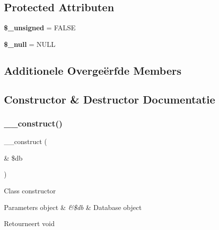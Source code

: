\subsection*{Protected Attributen}
\begin{DoxyCompactItemize}
\item 
\mbox{\label{class_c_i___d_b__sqlite3__forge_aae977ae6d61fa183f0b25422b6ddc31c}} 
{\bfseries \$\+\_\+unsigned} = F\+A\+L\+SE
\item 
\mbox{\label{class_c_i___d_b__sqlite3__forge_ae58fe6a5104d4a069a49b27533ce808f}} 
{\bfseries \$\+\_\+null} = \textquotesingle{}N\+U\+LL\textquotesingle{}
\end{DoxyCompactItemize}
\subsection*{Additionele Overge\"{e}rfde Members}


\subsection{Constructor \& Destructor Documentatie}
\mbox{\label{class_c_i___d_b__sqlite3__forge_aaf2ef772755ec6f361d44e16cc9ffd69}} 
\subsubsection{\texorpdfstring{\_\_construct()}{\_\_construct()}}
{\footnotesize\ttfamily \+\_\+\+\_\+construct (\begin{DoxyParamCaption}\item[{\&}]{\$db }\end{DoxyParamCaption})}

Class constructor


\begin{DoxyParams}[1]{Parameters}
object & {\em \&\$db} & Database object \\
\hline
\end{DoxyParams}
\begin{DoxyReturn}{Retourneert}
void 
\end{DoxyReturn}


